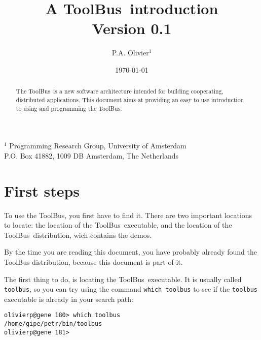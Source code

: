 \documentclass[a4,twoside,noweb]{article} %
\begin{document}
\newcommand{\TB}{{\sc ToolBus}}
\newcommand{\T}{{\bf T}}
\newcommand{\spec}[1]{{\rm #1}}
\newcommand{\script}[1]{{\tt #1}}
\newcommand{\ASFSDF}{{\sc Asf+Sdf}}
\newcommand{\ASF}{{\sc Asf}}
\newcommand{\SDF}{{\sc Sdf}}
\newcommand{\GEL}{{\sc Gel}}
\newcommand{\iter}{\,^*\,}
\newcommand{\emp}[1]{{\em #1}}
\newcommand{\txttt}[1]{{\tt #1}}

\title{A \TB\ introduction \\
Version 0.1}
\author{P.A. Olivier$^{1}$}
\date{\today}
\maketitle
\begin{center}
       {\footnotesize $^1$ Programming Research Group, University of Amsterdam\\
        P.O. Box 41882, 1009 DB Amsterdam, The Netherlands}
\end{center}

\begin{abstract}

The \TB\ is a new software architecture intended for building
cooperating, distributed applications.  This document aims
at providing an easy to use introduction to using and programming
the ToolBus.
\end{abstract}

\tableofcontents

\newpage

\section{First steps}

To use the \TB, you first have to find it. There are two important
locations to locate: the location of the \TB\ executable, and the
location of the \TB\ distribution, wich contains the demos.

By the time you are reading this document, you have probably already
found the ToolBus distribution, because this document is part of it.

The first thing to do, is locating the \TB\ executable. It is usually
called {\tt toolbus}, so you can try using the command {\tt which toolbus}
to see if the {\tt toolbus} executable is already in your
search path:

\begin{verbatim}
olivierp@gene 180> which toolbus
/home/gipe/petr/bin/toolbus
olivierp@gene 181>
\end{verbatim}
\end{document}
